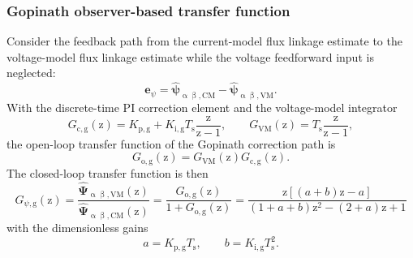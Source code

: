 \begin{frame}
    \frametitle{Gopinath observer-based transfer function}
    Consider the feedback path from the current-model flux linkage estimate to the voltage-model flux linkage estimate while the voltage feedforward input is neglected:
    \begin{equation}
        \bm{e}_\psi
        =
        \hat{\bm{\psi}}_{\upalpha\upbeta,\mathrm{CM}}
        -
        \hat{\bm{\psi}}_{\upalpha\upbeta,\mathrm{VM}} .
    \end{equation}\pause%
    With the discrete-time PI correction element and the voltage-model integrator
    \begin{equation}
        G_{\mathrm{c,g}}(\mathrm{z})
        =K_{\mathrm{p,g}}
        +K_{\mathrm{i,g}}T_\mathrm{s}\frac{\mathrm{z}}{\mathrm{z}-1},
        \qquad
        G_{\mathrm{VM}}(\mathrm{z})
        =T_\mathrm{s}\frac{\mathrm{z}}{\mathrm{z}-1},
    \end{equation}\pause%
    the open-loop transfer function of the Gopinath correction path is
    \begin{equation}
        G_{\mathrm{o,g}}(\mathrm{z})
        =G_{\mathrm{VM}}(\mathrm{z})G_{\mathrm{c,g}}(\mathrm{z}).
    \end{equation}\pause%
    The closed-loop transfer function is then
    \begin{equation}
        G_{\psi,\mathrm{g}}(\mathrm{z})
        =
        \frac{\hat{\bm{\Psi}}_{\upalpha\upbeta,\mathrm{VM}}(\mathrm{z})}
        {\hat{\bm{\Psi}}_{\upalpha\upbeta,\mathrm{CM}}(\mathrm{z})}
        =
        \frac{G_{\mathrm{o,g}}(\mathrm{z})}{1+G_{\mathrm{o,g}}(\mathrm{z})} =
        \frac{\mathrm{z}\left[(a+b)\mathrm{z}-a\right]}
        {(1+a+b)\mathrm{z}^2-(2+a)\mathrm{z}+1}
        \label{eq:gopinath_closed_loop_transfer_function}
    \end{equation}
    with the dimensionless gains
    \begin{equation}
        a=K_{\mathrm{p,g}}T_\mathrm{s},
        \qquad
        b=K_{\mathrm{i,g}}T_\mathrm{s}^2.
    \end{equation}
\end{frame}



